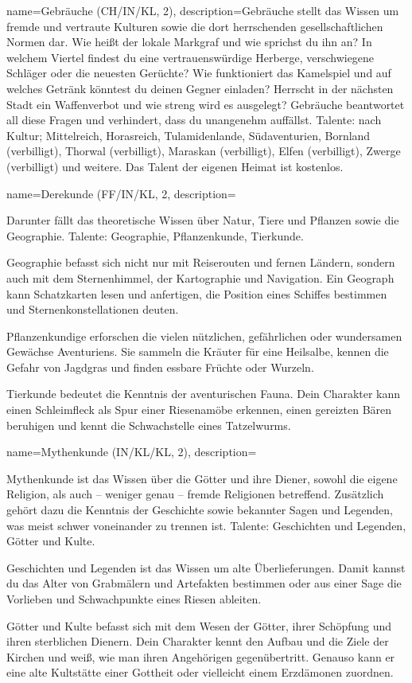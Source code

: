 {
    name={Gebräuche (CH/IN/KL, 2)},
    description={Gebräuche stellt das Wissen um fremde und vertraute Kulturen sowie die dort herrschenden gesellschaftlichen Normen dar. Wie heißt der lokale Markgraf und wie sprichst du ihn an? In welchem Viertel findest du eine vertrauenswürdige Herberge, verschwiegene Schläger oder die neuesten Gerüchte? Wie funktioniert das Kamelspiel und auf welches Getränk könntest du deinen Gegner einladen? Herrscht in der nächsten Stadt ein Waffenverbot und wie streng wird es ausgelegt? Gebräuche beantwortet all diese Fragen und verhindert, dass du unangenehm auffällst. Talente: nach Kultur; Mittelreich, Horasreich, Tulamidenlande, Südaventurien, Bornland (verbilligt), Thorwal (verbilligt), Maraskan (verbilligt), Elfen (verbilligt), Zwerge (verbilligt) und weitere. Das Talent der eigenen Heimat ist kostenlos.}}

{
    name={Derekunde (FF/IN/KL, 2},
    description={Darunter fällt das theoretische Wissen über Natur, Tiere und Pflanzen sowie die Geographie. Talente: Geographie, Pflanzenkunde, Tierkunde.
\begin{description}
\item Geographie befasst sich nicht nur mit Reiserouten und fernen Ländern, sondern auch mit dem Sternenhimmel, der Kartographie und Navigation. Ein Geograph kann Schatzkarten lesen und anfertigen, die Position eines Schiffes bestimmen und Sternenkonstellationen deuten.
\item Pflanzenkundige erforschen die vielen nützlichen, gefährlichen oder wundersamen Gewächse Aventuriens. Sie sammeln die Kräuter für eine Heilsalbe, kennen die Gefahr von Jagdgras und finden essbare Früchte oder Wurzeln.
\item Tierkunde bedeutet die Kenntnis der aventurischen Fauna. Dein Charakter kann einen Schleimfleck als Spur einer Riesenamöbe erkennen, einen gereizten Bären beruhigen und kennt die Schwachstelle eines Tatzelwurms.
\end{description}}}

{
    name={Mythenkunde (IN/KL/KL, 2)},
    description={Mythenkunde ist das Wissen über die Götter und ihre Diener, sowohl die eigene Religion, als auch – weniger genau – fremde Religionen betreffend. Zusätzlich gehört dazu die Kenntnis der Geschichte sowie bekannter Sagen und Legenden, was meist schwer voneinander zu trennen ist. Talente: Geschichten und Legenden, Götter und Kulte.
\begin{description}
\item Geschichten und Legenden ist das Wissen um alte Überlieferungen. Damit kannst du das Alter von Grabmälern und Artefakten bestimmen oder aus einer Sage die Vorlieben und Schwachpunkte eines Riesen ableiten.
\item Götter und Kulte befasst sich mit dem Wesen der Götter, ihrer Schöpfung und ihren sterblichen Dienern. Dein Charakter kennt den Aufbau und die Ziele der Kirchen und weiß, wie man ihren Angehörigen gegenübertritt. Genauso kann er eine alte Kultstätte einer Gottheit oder vielleicht einem Erzdämonen zuordnen.
\end{description}}}

